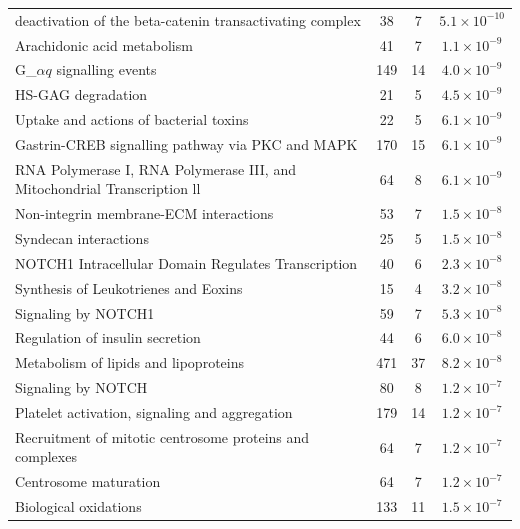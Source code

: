 \begin{table}[!hp]
{\begin{tabular}{lccc}
  \rowcolor{Cluster_Red!15} 
  deactivation of the beta-catenin transactivating complex &  38 &   7 & $5.1 \times 10^{-10}$ \\ 
  \rowcolor{Cluster_Red!20} 
  Arachidonic acid metabolism &  41 &   7 & $1.1 \times 10^{-9}$ \\ 
  \rowcolor{Cluster_Red!15} 
  G_${\alpha q}$ signalling events & 149 &  14 & $4.0 \times 10^{-9}$ \\ 
  \rowcolor{Cluster_Red!20} 
  HS-GAG degradation &  21 &   5 & $4.5 \times 10^{-9}$ \\ 
  \rowcolor{Cluster_Red!15} 
  Uptake and actions of bacterial toxins &  22 &   5 & $6.1 \times 10^{-9}$ \\ 
  \rowcolor{Cluster_Red!20} 
  Gastrin-CREB signalling pathway via PKC and MAPK & 170 &  15 & $6.1 \times 10^{-9}$ \\ 
  \rowcolor{Cluster_Red!15} 
  RNA Polymerase I, RNA Polymerase III, and Mitochondrial Transcription \textcolor{Cluster_Red!15}{ll}  &  64 &   8 & $6.1 \times 10^{-9}$ \\ 
  \rowcolor{Cluster_Red!20} 
  Non-integrin membrane-ECM interactions &  53 &   7 & $1.5 \times 10^{-8}$ \\ 
  \rowcolor{Cluster_Red!15} 
  Syndecan interactions &  25 &   5 & $1.5 \times 10^{-8}$ \\ 
  \rowcolor{Cluster_Red!20} 
  NOTCH1 Intracellular Domain Regulates Transcription &  40 &   6 & $2.3 \times 10^{-8}$ \\ 
  \rowcolor{Cluster_Red!15} 
  Synthesis of Leukotrienes and Eoxins &  15 &   4 & $3.2 \times 10^{-8}$ \\ 
  \rowcolor{Cluster_Red!20} 
  Signaling by NOTCH1 &  59 &   7 & $5.3 \times 10^{-8}$ \\ 
  \rowcolor{Cluster_Red!15} 
  Regulation of insulin secretion &  44 &   6 & $6.0 \times 10^{-8}$ \\ 
  \rowcolor{Cluster_Red!20} 
  Metabolism of lipids and lipoproteins & 471 &  37 & $8.2 \times 10^{-8}$ \\ 
  \rowcolor{Cluster_Red!15} 
  Signaling by NOTCH &  80 &   8 & $1.2 \times 10^{-7}$ \\ 
  \rowcolor{Cluster_Red!20} 
  Platelet activation, signaling and aggregation & 179 &  14 & $1.2 \times 10^{-7}$ \\ 
  \rowcolor{Cluster_Red!15} 
  Recruitment of mitotic centrosome proteins and complexes &  64 &   7 & $1.2 \times 10^{-7}$ \\ 
  \rowcolor{Cluster_Red!20} 
  Centrosome maturation &  64 &   7 & $1.2 \times 10^{-7}$ \\ 
  \rowcolor{Cluster_Red!15} 
  Biological oxidations & 133 &  11 & $1.5 \times 10^{-7}$ \\ 
  \hline
\end{tabular}
}
\end{table}


